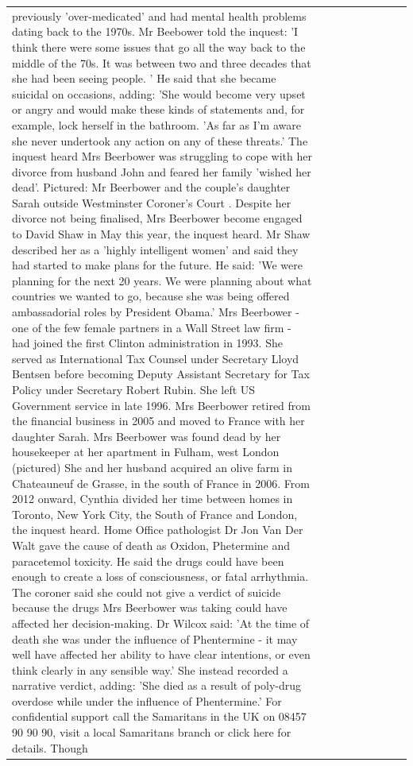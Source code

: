 \begin{table}[H]
\begin{tabular}{lllrlllll}
previously 'over-medicated' and had mental health problems dating back to the 1970s. Mr Beebower told the inquest: 'I think there were some issues that go all the way back to the middle of the 70s. It was between two and three decades that she had been seeing people. ' He said that she became suicidal on occasions, adding: 'She would become very upset or angry and would make these kinds of statements and, for example, lock herself in the bathroom. 'As far as I'm aware she never undertook any action on any of these threats.' The inquest heard Mrs Beerbower was struggling to cope with her divorce from husband John and feared her family 'wished her dead'. Pictured: Mr Beerbower and the couple's daughter Sarah outside Westminster Coroner's Court . Despite her divorce not being finalised, Mrs Beerbower become engaged to David Shaw in May this year, the inquest heard. Mr Shaw described her as a 'highly intelligent women' and said they had started to make plans for the future. He said: 'We were planning for the next 20 years. We were planning about what countries we wanted to go, because she was being offered ambassadorial roles by President Obama.' Mrs Beerbower - one of the few female partners in a Wall Street law firm - had joined the first Clinton administration in 1993. She served as International Tax Counsel under Secretary Lloyd Bentsen before becoming Deputy Assistant Secretary for Tax Policy under Secretary Robert Rubin. She left US Government service in late 1996. Mrs Beerbower retired from the financial business in 2005 and moved to France with her daughter Sarah. Mrs Beerbower was found dead by her housekeeper at her apartment in Fulham, west London (pictured) She and her husband acquired an olive farm in Chateauneuf de Grasse, in the south of France in 2006. From 2012 onward, Cynthia divided her time between homes in Toronto, New York City, the South of France and London, the inquest heard. Home Office pathologist Dr Jon Van Der Walt gave the cause of death as Oxidon, Phetermine and paracetemol toxicity. He said the drugs could have been enough to create a loss of consciousness, or fatal arrhythmia. The coroner said she could not give a verdict of suicide because the drugs Mrs Beerbower was taking could have affected her decision-making. Dr Wilcox said: 'At the time of death she was under the influence of Phentermine - it may well have affected her ability to have clear intentions, or even think clearly in any sensible way.' She instead recorded a narrative verdict, adding: 'She died as a result of poly-drug overdose while under the influence of Phentermine.' For confidential support call the Samaritans in the UK on 08457 90 90 90, visit a local Samaritans branch or click here for details. Though \\

\end{tabular}
\end{table}
